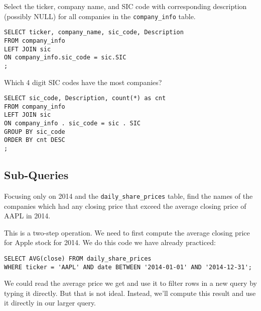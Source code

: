 \documentclass[10pt]{exam}
\begin{document}
\begin{questions}
\question Select the ticker, company name, and SIC code with corresponding
    description (possibly NULL) for
    all companies in the \texttt{company\_info} table. 

\begin{solution}
\begin{lstlisting}
SELECT ticker, company_name, sic_code, Description
FROM company_info
LEFT JOIN sic
ON company_info.sic_code = sic.SIC
;
\end{lstlisting}
\end{solution}

\question Which 4 digit SIC codes have the most companies?

\begin{solution}
\begin{lstlisting}
SELECT sic_code, Description, count(*) as cnt
FROM company_info
LEFT JOIN sic
ON company_info . sic_code = sic . SIC
GROUP BY sic_code
ORDER BY cnt DESC
;
\end{lstlisting}
\end{solution}


\subsection*{Sub-Queries}

\question
Focusing only on 2014 and the \texttt{daily\_share\_prices} table,
find the names of the companies which had any closing price that exceed the average closing price of AAPL in 2014.


\begin{solution}
This is a two-step operation.
We need to first compute the average closing price for Apple stock
for 2014.
We do this code we have already practiced:
\begin{lstlisting}
SELECT AVG(close) FROM daily_share_prices
WHERE ticker = 'AAPL' AND date BETWEEN '2014-01-01' AND '2014-12-31';
\end{lstlisting}

We could read the average price we get and use it to
filter rows in a new query by typing it directly.
But that is not ideal. Instead, we'll compute this
result and use it directly in our larger query.


\end{solution}
\end{questions}
\end{document}

